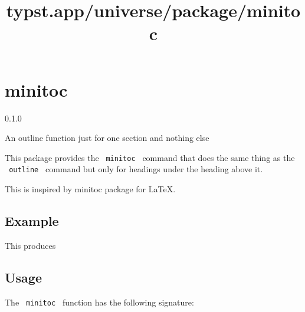 \title{typst.app/universe/package/minitoc}

\label{banner}
\section{minitoc}\label{minitoc}

{ 0.1.0 }

An outline function just for one section and nothing else

\label{readme}
This package provides the \texttt{\ minitoc\ } command that does the
same thing as the \texttt{\ outline\ } command but only for headings
under the heading above it.

This is inspired by minitoc package for LaTeX.

\subsection{Example}\label{example}

\begin{Shaded}
\begin{Highlighting}[]










\end{Highlighting}
\end{Shaded}

This produces


\subsection{Usage}\label{usage}

The \texttt{\ minitoc\ } function has the following signature:


